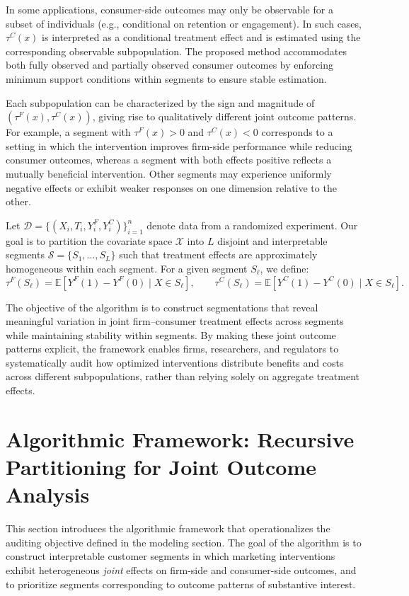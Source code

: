 \documentclass[11pt,letterpaper,english]{article}
\theoremstyle{definition}
\theoremstyle{definition}
\begin{document}
\begin{bibunit}
In some applications, consumer-side outcomes may only be observable for a subset of individuals (e.g., conditional on retention or engagement). In such cases, $\tau^C(x)$ is interpreted as a conditional treatment effect and is estimated using the corresponding observable subpopulation. The proposed method accommodates both fully observed and partially observed consumer outcomes by enforcing minimum support conditions within segments to ensure stable estimation.

Each subpopulation can be characterized by the sign and magnitude of $(\tau^F(x), \tau^C(x))$, giving rise to qualitatively different joint outcome patterns. For example, a segment with $\tau^F(x) > 0$ and $\tau^C(x) < 0$ corresponds to a setting in which the intervention improves firm-side performance while reducing consumer outcomes, whereas a segment with both effects positive reflects a mutually beneficial intervention. Other segments may experience uniformly negative effects or exhibit weaker responses on one dimension relative to the other.

Let $\mathcal{D} = \{(X_i, T_i, Y_i^F, Y_i^C)\}_{i=1}^n$ denote data from a randomized experiment. Our goal is to partition the covariate space $\mathcal{X}$ into $L$ disjoint and interpretable segments $\mathcal{S} = \{S_1, \dots, S_L\}$ such that treatment effects are approximately homogeneous within each segment. For a given segment $S_\ell$, we define:
\[
\tau^F(S_\ell) = \mathbb{E}[Y^F(1) - Y^F(0) \mid X \in S_\ell], \qquad
\tau^C(S_\ell) = \mathbb{E}[Y^C(1) - Y^C(0) \mid X \in S_\ell].
\]

The objective of the algorithm is to construct segmentations that reveal meaningful variation in joint firm--consumer treatment effects across segments while maintaining stability within segments. By making these joint outcome patterns explicit, the framework enables firms, researchers, and regulators to systematically audit how optimized interventions distribute benefits and costs across different subpopulations, rather than relying solely on aggregate treatment effects.


\section{Algorithmic Framework: Recursive Partitioning for Joint Outcome Analysis}

This section introduces the algorithmic framework that operationalizes the auditing objective defined in the modeling section. The goal of the algorithm is to construct interpretable customer segments in which marketing interventions exhibit heterogeneous \emph{joint} effects on firm-side and consumer-side outcomes, and to prioritize segments corresponding to outcome patterns of substantive interest.


\end{bibunit}
\end{document}
